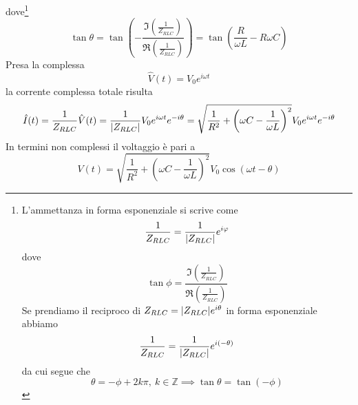 dove\footnote{L'ammettanza in forma esponenziale si scrive come
\begin{equation*}
	\frac{1}{Z_{RLC}}=\frac{1}{\abs{Z_{RLC}}}e^{i\varphi}
\end{equation*}
dove
\begin{equation*}
	\tan\phi=\frac{\Im \left(\frac{1}{Z_{RLC}}\right)}{\Re \left(\frac{1}{Z_{RLC}}\right)}
\end{equation*}
Se prendiamo il reciproco di $Z_{RLC}=\abs{Z_{RLC}}e^{i\theta}$ in forma esponenziale abbiamo
\begin{equation*}
	\frac{1}{Z_{RLC}}=\frac{1}{\abs{Z_{RLC}}}e^{i(-\theta)}
\end{equation*}
da cui segue che
\begin{equation*}
	\theta = -\phi+2k\pi,\ k\in\mathbb{Z}\implies\tan \theta=\tan(-\phi)
\end{equation*}}
\begin{equation*}
	\tan\theta=\tan\left(-\frac{\Im \left(\frac{1}{Z_{RLC}}\right)}{\Re \left(\frac{1}{Z_{RLC}}\right)}\right)=\tan\left(\frac{R}{\omega L}-R\omega C\right)
\end{equation*}
Presa la \ddp complessa
\begin{equation*}
	\hat{V}(t)=V_0e^{i\omega t}
\end{equation*}
la corrente complessa totale risulta
\begin{equation*}
	\hat{I}(t)=\frac{1}{Z_{RLC}}\hat{V}(t)=\frac{1}{\abs{Z_{RLC}}}V_0e^{i\omega t}e^{-i\theta}=\sqrt{\frac{1}{R^2}+\left(\omega C-\frac{1}{\omega L}\right)^2}V_0e^{i\omega t}e^{-i\theta}
\end{equation*}
In termini non complessi il voltaggio è pari a
\begin{equation*}
	V(t)=\sqrt{\frac{1}{R^2}+\left(\omega C-\frac{1}{\omega L}\right)^2}V_0\cos(\omega t -\theta)
\end{equation*}